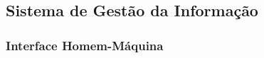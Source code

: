       
    
    \vfill
    
    \pagebreak
    \subsection{Sistema de Gestão da Informação}
      
      
    \subsubsection{Interface Homem-Máquina}
      	

    
    
    
    
    